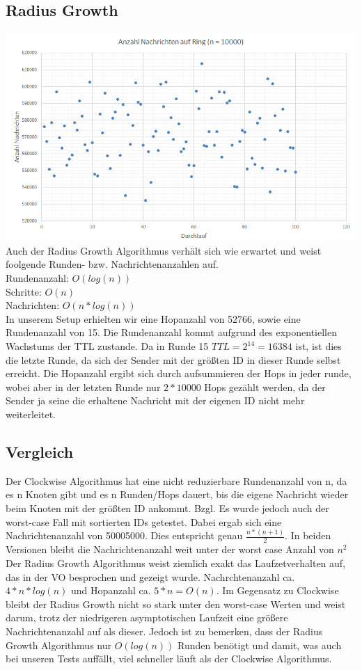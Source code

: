 \documentclass[12pt,a4paper]{report}
\begin{document}
\subsection*{Radius Growth}
\includegraphics[width=\textwidth]{rg.png}
Auch der Radius Growth Algorithmus verhält sich wie erwartet und weist foolgende Runden- bzw. Nachrichtenanzahlen auf.\\
Rundenanzahl: $O(log(n))$\\
Schritte: $O(n)$\\
Nachrichten: $O(n*log(n))$\\
In unserem Setup erhielten wir eine Hopanzahl von 52766, sowie eine Rundenanzahl von 15. Die Rundenanzahl kommt aufgrund des
exponentiellen Wachstums der TTL zustande. Da in Runde 15 $TTL = 2^{14} = 16384$ ist, ist dies die letzte Runde, da sich der Sender mit
der größten ID in dieser Runde selbst erreicht. Die Hopanzahl ergibt sich durch aufsummieren der Hops in jeder runde, wobei aber in der
letzten Runde nur $2*10000$ Hops gezählt werden, da der Sender ja seine die erhaltene Nachricht mit der eigenen ID nicht mehr weiterleitet.

\subsection*{Vergleich}
Der Clockwise Algorithmus hat eine nicht reduzierbare Rundenanzahl von n, da es n Knoten gibt und es n Runden/Hops dauert, bis die
eigene Nachricht wieder beim Knoten mit der größten ID ankommt.
Bzgl. Es wurde jedoch auch der worst-case Fall mit sortierten IDs getestet. Dabei ergab sich eine Nachrichtenanzahl von 50005000. Dies entspricht genau $\frac{n*(n+1)}{2}$. In beiden Versionen bleibt die Nachrichtenanzahl weit unter der worst case Anzahl von $n^2$\\
Der Radius Growth Algorithmus weist ziemlich exakt das Laufzetverhalten auf, das in der VO besprochen und gezeigt wurde. Nachrchtenanzahl ca. $4*n*log(n)$ und Hopanzahl ca. $5*n = O(n)$. Im Gegensatz zu Clockwise bleibt der Radius Growth nicht so stark unter den worst-case Werten und weist darum, trotz der niedrigeren asymptotischen Laufzeit eine größere Nachrichtenanzahl auf als dieser. Jedoch ist zu bemerken, dass der Radius Growth Algorithmus nur $O(log(n))$ Runden benötigt und damit, was auch bei unseren Tests auffällt, viel schneller läuft als der Clockwise Algorithmus.
\end{document}

